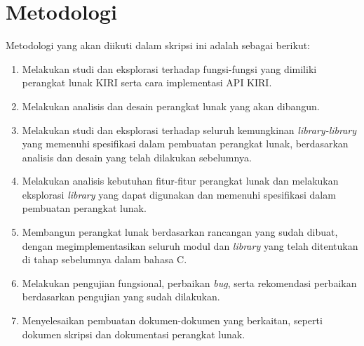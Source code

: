 \section{Metodologi}
\label{sec:metlit}
Metodologi yang akan diikuti dalam skripsi ini adalah sebagai berikut:
	\begin{enumerate}
		\item Melakukan studi dan eksplorasi terhadap fungsi-fungsi yang dimiliki perangkat lunak KIRI serta cara implementasi API KIRI.
		\item Melakukan analisis dan desain perangkat lunak yang akan dibangun.
	    \item Melakukan studi dan eksplorasi terhadap seluruh kemungkinan \textit{library-library} yang memenuhi spesifikasi dalam pembuatan perangkat lunak, berdasarkan analisis dan desain yang telah dilakukan sebelumnya.
		\item Melakukan analisis kebutuhan fitur-fitur perangkat lunak dan melakukan eksplorasi \textit{library} yang dapat digunakan dan memenuhi spesifikasi dalam pembuatan perangkat lunak.
		\item Membangun perangkat lunak berdasarkan rancangan yang sudah dibuat, dengan megimplementasikan seluruh modul dan \textit{library} yang telah ditentukan di tahap sebelumnya dalam bahasa C.
		\item Melakukan pengujian fungsional, perbaikan \textit{bug}, serta rekomendasi perbaikan berdasarkan pengujian yang sudah dilakukan.
		\item Menyelesaikan pembuatan dokumen-dokumen yang berkaitan, seperti dokumen skripsi dan dokumentasi perangkat lunak.
	\end{enumerate}


